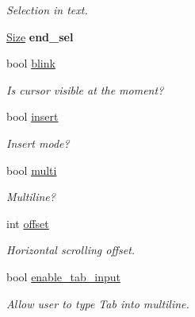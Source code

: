 \begin{DoxyCompactItemize}
\begin{DoxyCompactList}\small\item\em Selection in {\itshape text\/}. \end{DoxyCompactList}\item 
\hypertarget{classGUI_1_1Input_a0aacf882a9a705d09c03e46c3e998ecc}{\hyperlink{namespaceGUI_a10b6232e08729baa0bd211a86a69ce36}{Size} {\bfseries end\-\_\-sel}}\label{classGUI_1_1Input_a0aacf882a9a705d09c03e46c3e998ecc}

\item 
\hypertarget{classGUI_1_1Input_a311ee1e868abf69ca6ba892a6794b68b}{bool \hyperlink{classGUI_1_1Input_a311ee1e868abf69ca6ba892a6794b68b}{blink}}\label{classGUI_1_1Input_a311ee1e868abf69ca6ba892a6794b68b}

\begin{DoxyCompactList}\small\item\em Is cursor visible at the moment? \end{DoxyCompactList}\item 
\hypertarget{classGUI_1_1Input_af399004f35a82c4ef01e392ec17f30d5}{bool \hyperlink{classGUI_1_1Input_af399004f35a82c4ef01e392ec17f30d5}{insert}}\label{classGUI_1_1Input_af399004f35a82c4ef01e392ec17f30d5}

\begin{DoxyCompactList}\small\item\em Insert mode? \end{DoxyCompactList}\item 
\hypertarget{classGUI_1_1Input_adefcd920ff52c2078363d11ce336b7e4}{bool \hyperlink{classGUI_1_1Input_adefcd920ff52c2078363d11ce336b7e4}{multi}}\label{classGUI_1_1Input_adefcd920ff52c2078363d11ce336b7e4}

\begin{DoxyCompactList}\small\item\em Multiline? \end{DoxyCompactList}\item 
\hypertarget{classGUI_1_1Input_ad3725c78fcdbe131c8f209a41f520150}{int \hyperlink{classGUI_1_1Input_ad3725c78fcdbe131c8f209a41f520150}{offset}}\label{classGUI_1_1Input_ad3725c78fcdbe131c8f209a41f520150}

\begin{DoxyCompactList}\small\item\em Horizontal scrolling offset. \end{DoxyCompactList}\item 
\hypertarget{classGUI_1_1Input_a379257828d778eed79d3ef4646bac7d3}{bool \hyperlink{classGUI_1_1Input_a379257828d778eed79d3ef4646bac7d3}{enable\-\_\-tab\-\_\-input}}\label{classGUI_1_1Input_a379257828d778eed79d3ef4646bac7d3}

\begin{DoxyCompactList}\small\item\em Allow user to type Tab into multiline. \end{DoxyCompactList}\end{DoxyCompactItemize}


